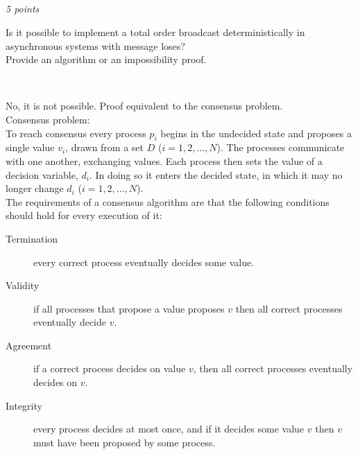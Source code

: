 \documentclass[a4paper]{article}
\newcommand{\points}[1]{\subsection{} \textit{#1 points}\\}
\newcommand{\question}[2][]{
  \parbox[t]{\textwidth}{
    \ifthenelse{\equal{#1}{}}{}{#1)}
    \parbox[t]{0.95\textwidth}{#2}}\\}
\newcommand{\solution}[2][]{
  \ifthenelse{\equal{#1}{} \or \equal{#1}{a}}{\\[3pt]\textit{Solution: }\\[0.1cm]}{}
  \parbox[t]{\textwidth}{
    \ifthenelse{\equal{#1}{}}{}{#1)}
    \parbox[t]{0.95\textwidth}{#2}}\\
}
\begin{document}
{  
}


\points{5}
\question{
  Is it possible to implement a total order broadcast
  deterministically in asynchronous systems with message loses? \\
  Provide an algorithm or an impossibility proof.
}
\solution{
  No, it is not possible. Proof equivalent to the consensus problem.\\
  Consensus problem:\\
  To reach consensus every process $p_i$ begins in the undecided
  state and proposes a single value $v_i$, drawn from a set $D$ ($i =
  1, 2, ..., N$). The processes communicate with one another,
  exchanging values. Each process then sets the value of a decision
  variable, $d_i$. In doing so it enters the decided state, in which
  it may no longer change $d_i$ ($i = 1, 2, ..., N$). \\

  The requirements of a consensus algorithm are that the following
  conditions should hold for every execution of it:
  \begin{description}
    \item[Termination] every correct process eventually decides some
      value.
    \item[Validity] if all processes that propose a value proposes $v$
      then all correct processes eventually decide $v$.
    \item[Agreement] if a correct process decides on value $v$, then
      all correct processes eventually decides on $v$.
    \item[Integrity] every process decides at most once, and if it
      decides some value $v$ then $v$ must have been proposed by some
      process.
  \end{description}

}
\end{document}
